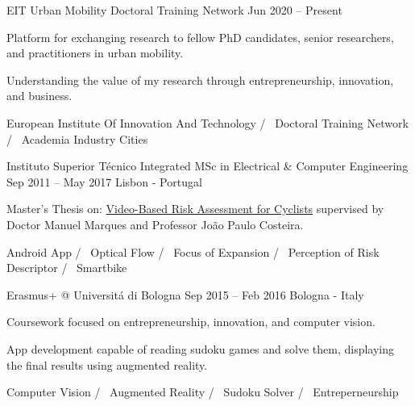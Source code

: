 \begin{cventries}
  \cventryinner
    {EIT Urban Mobility Doctoral Training Network} %
    {Jun 2020 – Present} %
    {} %
    {
      \begin{cvitems} %
        \item {Platform for exchanging research to fellow PhD candidates, senior researchers, and practitioners in urban mobility.}
        \item {Understanding the value of my research through entrepreneurship, innovation, and business.}
      \end{cvitems}
    }
    {
      European Institute Of Innovation And Technology /~
      Doctoral Training Network /~
      Academia Industry Cities ~
    }


  \cventry
    {Instituto Superior Técnico} %
    {Integrated MSc in Electrical \& Computer Engineering} %
    {Sep 2011 – May 2017} %
    {Lisbon - Portugal} %
    {
      \begin{cvitems} %
        \item {Master’s Thesis on: \underline{Video-Based Risk Assessment for Cyclists} supervised by Doctor Manuel Marques and Professor João Paulo Costeira.}
      \end{cvitems}
    }
    {
      Android App /~
      Optical Flow /~
      Focus of Expansion /~
      Perception of Risk Descriptor /~
      Smartbike ~
    }

  \cventryinner
    {Erasmus+ @ Universitá di Bologna} %
    {Sep 2015 – Feb 2016} %
    {Bologna - Italy} %
    {
    	\begin{cvitems} %
    		\item {Coursework focused on entrepreneurship, innovation, and computer vision.}
    		\item {App development capable of reading sudoku games and solve them, displaying the final results using augmented reality.}
    	\end{cvitems}
    }
    {
    	Computer Vision /~
    	Augmented Reality /~
    	Sudoku Solver /~
    	Entreperneurship ~   	
    }
 
\end{cventries}
